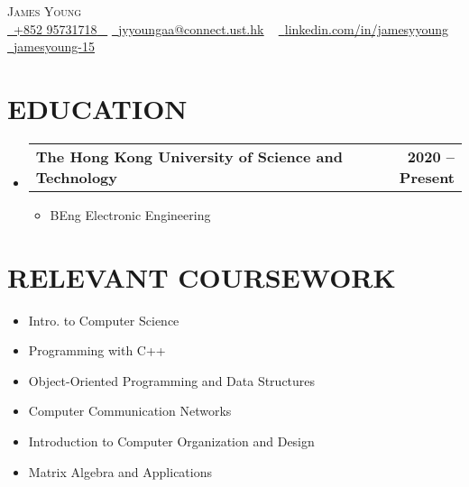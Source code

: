 \documentclass[letterpaper,11pt]{article}
\makeatletter
\newcommand{\resumeItem}[1]{
  \item\small{
    {#1 \vspace{-2pt}}
  }
}
\newcommand{\resumeSubheading}[4]{
  \vspace{-2pt}\item
    \begin{tabular*}{1.0\textwidth}[t]{l@{\extracolsep{\fill}}r}
      \textbf{\large#1} & \textbf{\small #2} \\
    \end{tabular*}\vspace{-7pt}
}
\newcommand{\resumeSubHeadingListStart}{\begin{itemize}[leftmargin=0.0in, label={}]}
\newcommand{\resumeSubHeadingListEnd}{\end{itemize}}
\newcommand{\resumeItemListStart}{\begin{itemize}}
\newcommand{\resumeItemListEnd}{\end{itemize}\vspace{-5pt}}
\makeatother
\begin{document}


\begin{center}
    {\Huge \scshape James Young} \\ \vspace{2pt}
    \small \href{tel:+85295731718}{ \raisebox{-0.1\height}\faPhone\ \underline{+852 95731718} ~} \href{mailto:jyyoungaa@connect.ust.hk}{\raisebox{-0.2\height}\faEnvelope\  \underline{jyyoungaa@connect.ust.hk}} ~ 
    \href{https://linkedin.com/in/JamesYYoung}{\raisebox{-0.2\height}\faLinkedinSquare\ \underline{linkedin.com/in/jamesyyoung}}  ~
    \href{https://github.com/jamesyoung-15}{\raisebox{-0.2\height}\faGithub\ \underline{jamesyoung-15}} ~
\end{center}

\section{EDUCATION}
  \resumeSubHeadingListStart
    \resumeSubheading
      {The Hong Kong University of Science and Technology}{2020 -- Present}
      {}{}
        \resumeItemListStart
            \resumeItem{\normalsize{BEng Electronic Engineering}}
        \resumeItemListEnd  
  \resumeSubHeadingListEnd

\section{RELEVANT COURSEWORK}
    \begin{multicols}{2}
        \begin{itemize}[itemsep=-2pt, parsep=5pt]
        \small
            \item Intro. to Computer Science
            \item Programming with C++
            \item Object-Oriented Programming and Data Structures
            \item Computer Communication Networks
            \item Introduction to Computer Organization and Design
            \item Matrix Algebra and Applications
        \end{itemize}
    \end{multicols}
        \vspace*{2.0\multicolsep}
\vspace{5pt}
\end{document}

